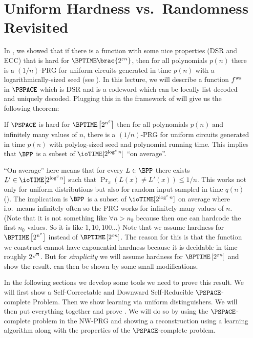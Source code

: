 \newcommand{\fn}{\mathbb{F}_n}
\newcommand\antipi{\rotatebox[origin=c]{180}{$\Pi$}}

\chapter{Uniform Hardness vs.\ Randomness Revisited}
\label{lec:08}

In , we showed that if there is a function with some nice properties (DSR and ECC) that is hard for $\BPTIME\brac{2^{\eps n}}$, then for all polynomials $p(n)$ there is a $(1/n)$-PRG for uniform circuits generated in time $p(n)$ with a logarithmically-sized seed (see ). 
In this lecture, we will describe a function $ f^{\text{ws}} $ in $\PSPACE$ which is DSR and is a codeword which can be locally list decoded and uniquely decoded. Plugging this in the framework of  will give us the following theorem:
\begin{theorem}\label{thm:uniform-hard-random-PSPACE}
	If $\PSPACE$ is hard for $\BPTIME\left[2^{n^\eps}\right]$ then for all polynomials $p(n)$ and infinitely many values of $n$, there is a $(1/n)$-PRG for uniform circuits generated in time $p(n)$ with polylog-sized seed and polynomial running time. This implies that $\BPP$ is a subset of $\ioTIME[2^{\log^c n}]$ ``on average''.
\end{theorem}

``On average'' here means that for every $L \in \BPP$ there exists $L' \in \ioTIME[2^{\log^c n}]$ such that $\Pr_x(L(x) \neq L'(x)) \leq 1/n$. This works not only for uniform distributions but also for random input sampled in time $q(n)$ ().
The implication is $\BPP$ is a subset of $\ioTIME[2^{\log^c n}]$ on average where i.o.\ means infinitely often so the PRG works for infinitely many values of $n$. (Note that it is not something like $\forall n > n_0$ because then one can hardcode the first $n_0$ values. So it is like $1,10,100 \ldots$)
Note that we assume hardness for $\BPTIME\left[2^{n^\eps}\right]$ instead of $\BPTIME\left[2^{\eps n}\right]$. The reason for this is that the function we construct cannot have exponential hardness because it is decidable in time roughly $2^{\sqrt{n}}$. But for \emph{simplicity} we will assume hardness for $\BPTIME\left[2^{\eps n}\right]$ and show the result.  can then be shown by some small modifications.

In the following sections we develop some tools we need to prove this result. We will first show a Self-Correctable and Downward Self-Reducible $\PSPACE$-complete Problem. Then we show learning via uniform distinguishers. We will then put everything together and prove . We will do so by using the $\PSPACE$-complete problem in the NW-PRG and showing a reconstruction using a learning algorithm along with the properties of the $\PSPACE$-complete problem.

